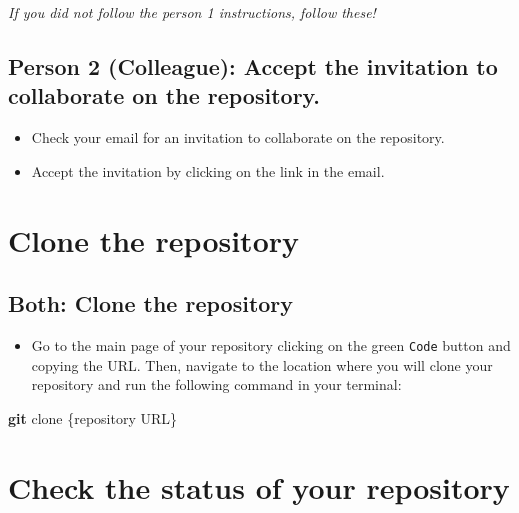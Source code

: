 \documentclass[
]{book}
\newenvironment{Shaded}{\begin{snugshade}}{\end{snugshade}}
\newcommand{\FunctionTok}[1]{\textcolor[rgb]{0.13,0.29,0.53}{\textbf{#1}}}
\newcommand{\NormalTok}[1]{#1}
\providecommand{\tightlist}{%
  \setlength{\itemsep}{0pt}\setlength{\parskip}{0pt}}
\begin{document}
\emph{If you did not follow the person 1 instructions, follow these!}

\hypertarget{person-2-colleague-accept-the-invitation-to-collaborate-on-the-repository.}{%
\subsection{\texorpdfstring{\textbf{Person 2 (Colleague):} Accept the invitation to collaborate on the repository.}{Person 2 (Colleague): Accept the invitation to collaborate on the repository.}}\label{person-2-colleague-accept-the-invitation-to-collaborate-on-the-repository.}}

\begin{itemize}
\tightlist
\item
  Check your email for an invitation to collaborate on the repository.
\item
  Accept the invitation by clicking on the link in the email.
\end{itemize}

\hypertarget{clone-the-repository}{%
\section{Clone the repository}\label{clone-the-repository}}

\hypertarget{both-clone-the-repository}{%
\subsection{\texorpdfstring{\textbf{Both:} Clone the repository}{Both: Clone the repository}}\label{both-clone-the-repository}}

\begin{itemize}
\tightlist
\item
  Go to the main page of your repository clicking on the green \texttt{Code} button and copying the URL. Then, navigate to the location where you will clone your repository and run the following command in your terminal:
\end{itemize}

\begin{Shaded}
\begin{Highlighting}[]
\FunctionTok{git}\NormalTok{ clone \{repository URL\}}
\end{Highlighting}
\end{Shaded}

\hypertarget{check-the-status-of-your-repository}{%
\section{Check the status of your repository}\label{check-the-status-of-your-repository}}
\end{document}
